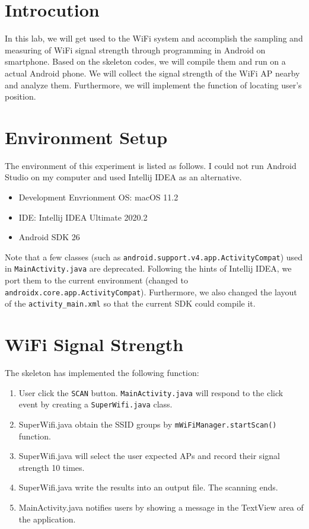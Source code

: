 \section{Introcution}

In this lab, we will get used to the WiFi system and accomplish the sampling and measuring of WiFi signal strength through programming in Android on smartphone. Based on the skeleton codes, we will compile them and run on a actual Android phone. We will collect the signal strength of the WiFi AP nearby and analyze them. Furthermore, we will implement the function of locating user's position.

\section{Environment Setup}

The environment of this experiment is listed as follows. I could not run Android Studio on my computer and used Intellij IDEA as an alternative.

\begin{itemize}
  \item Development Envrionment OS: macOS 11.2
  \item IDE: Intellij IDEA Ultimate 2020.2
  \item Android SDK 26
\end{itemize}

Note that a few classes (such as \texttt{android.support.v4.app.ActivityCompat}) used in \texttt{MainActivity.java} are deprecated. Following the hints of Intellij IDEA, we port them to the current environment (changed to \texttt{androidx.core.app.ActivityCompat}). Furthermore, we also changed the layout of the \texttt{activity\_main.xml} so that the current SDK could compile it.


\section{WiFi Signal Strength}

The skeleton has implemented the following function:
\begin{enumerate}
  \item User click the \texttt{SCAN} button. \texttt{MainActivity.java} will respond to the click event by creating a \texttt{SuperWifi.java} class.
  \item {SuperWifi.java} obtain the SSID groups by \texttt{mWiFiManager.startScan()} function.
  \item {SuperWifi.java} will select the user expected APs and record their signal strength 10 times.
  \item {SuperWifi.java} write the results into an output file. The scanning ends.
  \item {MainActivity.java} notifies users by showing a message in the TextView area of the application.
\end{enumerate}

